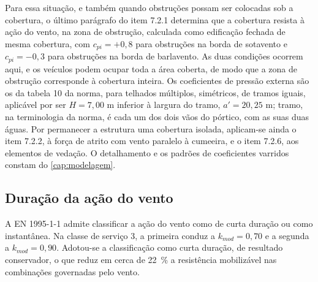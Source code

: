 Para essa situação, e também quando obstruções possam ser colocadas sob a
cobertura, o último parágrafo do item 7.2.1 determina que a cobertura resista à
ação do vento, na zona de obstrução, calculada como edificação fechada de mesma
cobertura, com $c_{pi} = +0{,}8$ para obstruções na borda de sotavento e
$c_{pi} = -0{,}3$ para obstruções na borda de barlavento. As duas condições
ocorrem aqui, e os veículos podem ocupar toda a área coberta, de modo que a zona
de obstrução corresponde à cobertura inteira. Os coeficientes de pressão
externa são os da tabela 10 da norma, para telhados múltiplos, simétricos, de
tramos iguais, aplicável por ser $H = 7{,}00$ m inferior à largura do tramo,
$a' = 20{,}25$ m; tramo, na terminologia da norma, é cada um dos dois vãos do
pórtico, com as suas duas águas. Por permanecer a estrutura uma cobertura isolada, aplicam-se
ainda o item 7.2.2, à força de atrito com vento paralelo à cumeeira, e o item
7.2.6, aos elementos de vedação. O detalhamento e os padrões de coeficientes
varridos constam do \autoref{cap:modelagem}.

\subsection{Duração da ação do vento}\label{ssec:duracao-vento}

A EN 1995-1-1 \cite{EN1995-1-1:2004} admite classificar a ação do vento como de
curta duração ou como instantânea. Na classe de serviço 3, a primeira conduz a
$k_{mod} = 0{,}70$ e a segunda a $k_{mod} = 0{,}90$. Adotou-se a classificação como
curta duração, de resultado conservador, o que reduz em cerca de 22~\%
a resistência mobilizável nas combinações governadas pelo vento.
